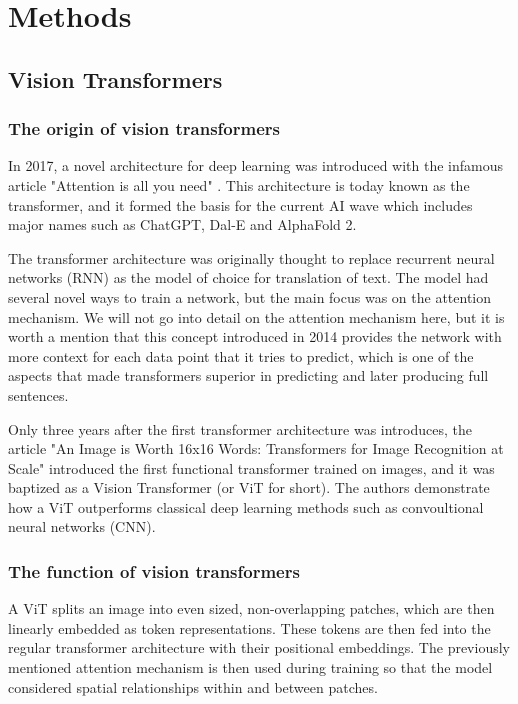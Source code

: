 \section{Methods}\label{sec:methods}

%

\subsection{Vision Transformers} \label{ssec:vit}
\subsubsection{The origin of vision transformers}
In 2017, a novel architecture for deep learning was introduced with the infamous article 
"Attention is all you need" \cite{attention}. This architecture is today known as the 
transformer, and it formed the basis for the current AI wave which includes major 
names such as ChatGPT, Dal-E and AlphaFold 2.

The transformer architecture was originally thought to replace recurrent neural networks (RNN)
as the model of choice for translation of text. The model had several novel ways to train a network,
but the main focus was on the attention mechanism. We will not go into detail on the attention
mechanism here, but it is worth a mention that this concept introduced in 2014 \cite{first_attention}
provides the network with more context for each data point that it tries to predict, which is one
of the aspects that made transformers superior in predicting and later producing full sentences. 

Only three years after the first transformer architecture was introduces, the article 
"An Image is Worth 16x16 Words: Transformers for Image Recognition at Scale" \cite{first_vit}
introduced the first functional transformer trained on images, and it was baptized as a Vision
Transformer (or ViT for short). The authors demonstrate how a ViT outperforms classical 
deep learning methods such as convoultional neural networks (CNN). 

\subsubsection{The function of vision transformers}
A ViT splits an image into even sized, non-overlapping patches, which are then linearly embedded
as token representations. These tokens are then fed into the regular transformer architecture with 
their positional embeddings. The previously mentioned attention mechanism is then used during training
so that the model considered spatial relationships within and between patches. 

